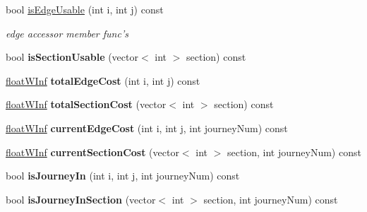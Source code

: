 \begin{DoxyCompactItemize}
\item 
\hypertarget{classgraphGroup_a7ba2ca173dbc5245e7a13438e0cec173}{
bool \hyperlink{classgraphGroup_a7ba2ca173dbc5245e7a13438e0cec173}{isEdgeUsable} (int i, int j) const }
\label{classgraphGroup_a7ba2ca173dbc5245e7a13438e0cec173}

\begin{DoxyCompactList}\small\item\em edge accessor member func's \end{DoxyCompactList}\item 
\hypertarget{classgraphGroup_a8e35d7b0e757b6b884280e0f24e6ded8}{
bool {\bfseries isSectionUsable} (vector$<$ int $>$ section) const }
\label{classgraphGroup_a8e35d7b0e757b6b884280e0f24e6ded8}

\item 
\hypertarget{classgraphGroup_aa05ba1c3c8c2df1c632287b7a4945736}{
\hyperlink{classfloatWInf}{floatWInf} {\bfseries totalEdgeCost} (int i, int j) const }
\label{classgraphGroup_aa05ba1c3c8c2df1c632287b7a4945736}

\item 
\hypertarget{classgraphGroup_a080e5ef3a3040050a02a71295349d4db}{
\hyperlink{classfloatWInf}{floatWInf} {\bfseries totalSectionCost} (vector$<$ int $>$ section) const }
\label{classgraphGroup_a080e5ef3a3040050a02a71295349d4db}

\item 
\hypertarget{classgraphGroup_ad9ad2756fc32ca48ee57aa966e01da55}{
\hyperlink{classfloatWInf}{floatWInf} {\bfseries currentEdgeCost} (int i, int j, int journeyNum) const }
\label{classgraphGroup_ad9ad2756fc32ca48ee57aa966e01da55}

\item 
\hypertarget{classgraphGroup_a3596d01db65073307da3df43ac504434}{
\hyperlink{classfloatWInf}{floatWInf} {\bfseries currentSectionCost} (vector$<$ int $>$ section, int journeyNum) const }
\label{classgraphGroup_a3596d01db65073307da3df43ac504434}

\item 
\hypertarget{classgraphGroup_a65e666d25f71a5f1d70818bc86cbdd0f}{
bool {\bfseries isJourneyIn} (int i, int j, int journeyNum) const }
\label{classgraphGroup_a65e666d25f71a5f1d70818bc86cbdd0f}

\item 
\hypertarget{classgraphGroup_a988073570ad9778e969141cf9b722b7a}{
bool {\bfseries isJourneyInSection} (vector$<$ int $>$ section, int journeyNum) const }
\label{classgraphGroup_a988073570ad9778e969141cf9b722b7a}


\end{DoxyCompactItemize}
